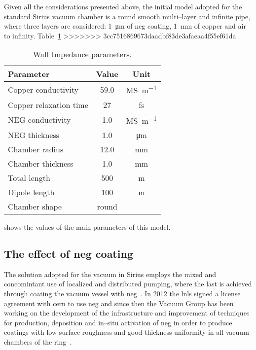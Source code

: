     Given all the considerations presented above, the initial model adopted for the standard Sirius vacuum chamber is a round smooth multi--layer and infinite pipe, where three layers are considered: \SI{1}{\micro\meter} of \gls{neg} coating, \SI{1}{\milli\meter} of copper and air to infinity. Table~\ref{tab:wall_impedance_parameters}
>>>>>>> 3cc7516869673daadbf83de3afaeaa4f55ef61da
    \begin{table}
        \centering
        \caption{Wall Impedance parameters.}
        \label{tab:wall_impedance_parameters}
        \begin{tabular}{lcc}
            \toprule
            Parameter              &   Value    & Unit \\
            \midrule
            Copper conductivity    &   59.0     & \si{\mega\siemens\per\meter}\\
            Copper relaxation time &   27       & \si{\femto\second}\\
            NEG conductivity       &   1.0      & \si{\mega\siemens\per\meter}\\
            NEG thickness          &   1.0      & \si{\micro\meter}\\
            Chamber radius         &  12.0      & \si{\milli\meter}\\
            Chamber thickness      &   1.0      & \si{\milli\meter}\\
            Total length           &  500       & \si{\meter}\\
            Dipole length          &  100       & \si{\meter}\\
            Chamber shape          & round      & \\
            \bottomrule
        \end{tabular}
    \end{table}
    shows the values of the main parameters of this model.

\subsection{The effect of \gls{neg} coating}

    The solution adopted for the vacuum in Sirius employs the mixed and concomintant use of localized and distributed pumping, where the last is achieved through coating the vacuum vessel with \gls{neg}~\cite{Benvenuti1998,Prodromides2002}. In 2012 the \gls{lnls} signed a license agreement with \gls{cern} to use \gls{neg} and since then the Vacuum Group has been working on the development of the infrastructure and improvement of techniques for production, deposition and in--situ activation of \gls{neg} in order to produce coatings with low surface roughness and good thickness uniformity in all vacuum chambers of the ring~\cite{Seraphim2015,Rocha2017}.

